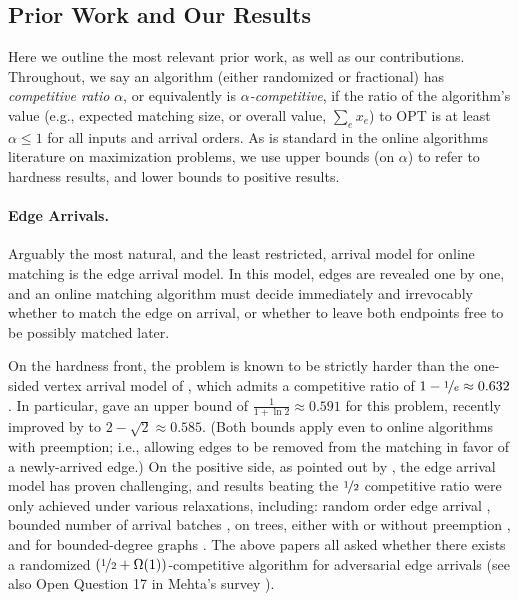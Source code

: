 \subsection{Prior Work and Our Results}
Here we outline the most relevant prior work, as well as our contributions. Throughout, we say an algorithm (either randomized or fractional) has \emph{competitive ratio} $\alpha$, or equivalently is \emph{$\alpha$-competitive}, if the ratio of the algorithm's value (e.g., expected matching size, or overall value, $\sum_e x_e$) to OPT is at least $\alpha\leq 1$ for all inputs and arrival orders. As is standard in the online algorithms literature on maximization problems, we use upper bounds (on $\alpha$) to refer to hardness results, and lower bounds to positive results.

\vspace{-0.1cm}
\paragraph{Edge Arrivals.} Arguably the most natural, and the least restricted, arrival model for online matching is the edge arrival model. In this model, edges are revealed one by one, and an online matching algorithm must decide immediately and irrevocably whether to match the edge on arrival, or whether to leave both endpoints free to be possibly matched later.

On the hardness front, the problem is known to be strictly harder than the one-sided vertex arrival model of \citet{karp1990optimal}, which admits a competitive ratio of $1-\nicefrac1e \approx 0.632$.
In particular, \citet{epstein2013improved} gave an upper bound of $\frac{1}{1+\ln2} \approx 0.591$ for this problem,
recently improved by \citet{huang2019tight} to $2-\sqrt{2}\approx 0.585$. (Both bounds apply even to online algorithms with preemption; i.e., allowing edges to be removed from the matching in favor of a newly-arrived edge.)
On the positive side, as pointed out by \citet{buchbinder2018online}, the edge arrival model has proven challenging, and results beating the $\nicefrac{1}{2}$ competitive ratio were only achieved under various relaxations, including: random order edge arrival 
\cite{guruganesh2017online}, bounded number of arrival batches \cite{lee2017maximum}, on trees, either with or without preemption \cite{tirodkar2017maximum,buchbinder2018online}, and for bounded-degree graphs \cite{buchbinder2018online}.
The above papers all asked whether there exists a randomized $(\nicefrac{1}{2}+\Omega(1))$-competitive algorithm for adversarial edge arrivals (see also Open Question 17 in Mehta's survey \cite{mehta2013online}).


